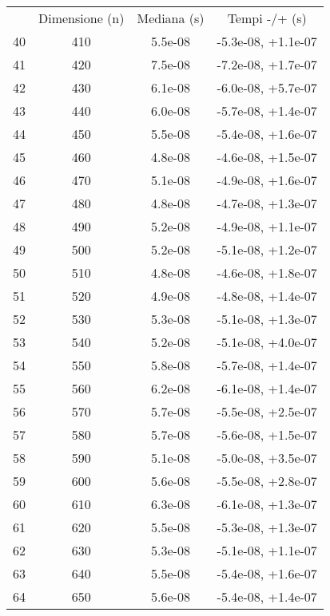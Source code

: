 \begin{table}
\centering
\begin{adjustbox}{width=1\textwidth/2}
\begin{tabular}{|c|c|c|c|}
\hline
 & Dimensione (n) & Mediana (s) & Tempi -/+ (s) \\
40 & 410 & 5.5e-08 & -5.3e-08, +1.1e-07 \\
\cline{1-4}
41 & 420 & 7.5e-08 & -7.2e-08, +1.7e-07 \\
\cline{1-4}
42 & 430 & 6.1e-08 & -6.0e-08, +5.7e-07 \\
\cline{1-4}
43 & 440 & 6.0e-08 & -5.7e-08, +1.4e-07 \\
\cline{1-4}
44 & 450 & 5.5e-08 & -5.4e-08, +1.6e-07 \\
\cline{1-4}
45 & 460 & 4.8e-08 & -4.6e-08, +1.5e-07 \\
\cline{1-4}
46 & 470 & 5.1e-08 & -4.9e-08, +1.6e-07 \\
\cline{1-4}
47 & 480 & 4.8e-08 & -4.7e-08, +1.3e-07 \\
\cline{1-4}
48 & 490 & 5.2e-08 & -4.9e-08, +1.1e-07 \\
\cline{1-4}
49 & 500 & 5.2e-08 & -5.1e-08, +1.2e-07 \\
\cline{1-4}
50 & 510 & 4.8e-08 & -4.6e-08, +1.8e-07 \\
\cline{1-4}
51 & 520 & 4.9e-08 & -4.8e-08, +1.4e-07 \\
\cline{1-4}
52 & 530 & 5.3e-08 & -5.1e-08, +1.3e-07 \\
\cline{1-4}
53 & 540 & 5.2e-08 & -5.1e-08, +4.0e-07 \\
\cline{1-4}
54 & 550 & 5.8e-08 & -5.7e-08, +1.4e-07 \\
\cline{1-4}
55 & 560 & 6.2e-08 & -6.1e-08, +1.4e-07 \\
\cline{1-4}
56 & 570 & 5.7e-08 & -5.5e-08, +2.5e-07 \\
\cline{1-4}
57 & 580 & 5.7e-08 & -5.6e-08, +1.5e-07 \\
\cline{1-4}
58 & 590 & 5.1e-08 & -5.0e-08, +3.5e-07 \\
\cline{1-4}
59 & 600 & 5.6e-08 & -5.5e-08, +2.8e-07 \\
\cline{1-4}
60 & 610 & 6.3e-08 & -6.1e-08, +1.3e-07 \\
\cline{1-4}
61 & 620 & 5.5e-08 & -5.3e-08, +1.3e-07 \\
\cline{1-4}
62 & 630 & 5.3e-08 & -5.1e-08, +1.1e-07 \\
\cline{1-4}
63 & 640 & 5.5e-08 & -5.4e-08, +1.6e-07 \\
\cline{1-4}
64 & 650 & 5.6e-08 & -5.4e-08, +1.4e-07 \\

\end{tabular}
\end{adjustbox}
\end{table}
